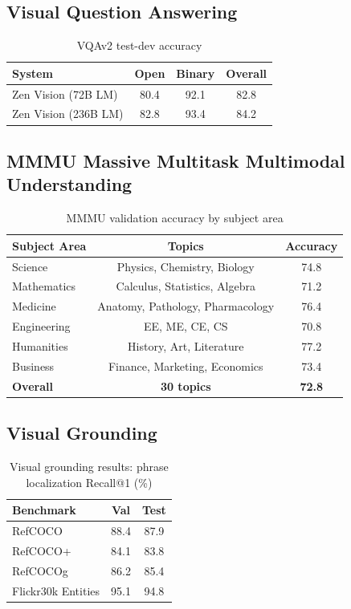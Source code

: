 \documentclass[11pt,a4paper]{article}
\begin{document}
\subsection{Visual Question Answering}

\begin{table}[H]
\centering
\caption{VQAv2 test-dev accuracy}
\label{tab:vqa}
\begin{tabular}{lccc}
\toprule
System & Open & Binary & Overall \\
\midrule
Zen Vision (72B LM) & 80.4 & 92.1 & 82.8 \\
Zen Vision (236B LM) & 82.8 & 93.4 & 84.2 \\
\bottomrule
\end{tabular}
\end{table}

\subsection{MMMU Massive Multitask Multimodal Understanding}

\begin{table}[H]
\centering
\caption{MMMU validation accuracy by subject area}
\label{tab:mmmu}
\begin{tabular}{lcc}
\toprule
Subject Area & Topics & Accuracy \\
\midrule
Science & Physics, Chemistry, Biology & 74.8 \\
Mathematics & Calculus, Statistics, Algebra & 71.2 \\
Medicine & Anatomy, Pathology, Pharmacology & 76.4 \\
Engineering & EE, ME, CE, CS & 70.8 \\
Humanities & History, Art, Literature & 77.2 \\
Business & Finance, Marketing, Economics & 73.4 \\
\midrule
\textbf{Overall} & \textbf{30 topics} & \textbf{72.8} \\
\bottomrule
\end{tabular}
\end{table}

\subsection{Visual Grounding}

\begin{table}[H]
\centering
\caption{Visual grounding results: phrase localization Recall@1 (\%)}
\label{tab:grounding}
\begin{tabular}{lcc}
\toprule
Benchmark & Val & Test \\
\midrule
RefCOCO & 88.4 & 87.9 \\
RefCOCO+ & 84.1 & 83.8 \\
RefCOCOg & 86.2 & 85.4 \\
Flickr30k Entities & 95.1 & 94.8 \\
\bottomrule
\end{tabular}
\end{table}
\end{document}
